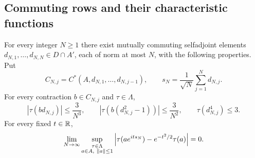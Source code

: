\subsection{Commuting rows and their characteristic functions}

\begin{proposition}
\label{u:prop:conditional-clt}
For every integer $N\geq1$ there exist mutually commuting selfadjoint
elements $d_{N,1},\ldots,d_{N,N}\in D\cap A'$, each of norm at most
$N$, with the following properties.  Put
\[
  C_{N,j}=C^*(A,d_{N,1},\ldots,d_{N,j-1}),
  \qquad
  s_N=\frac{1}{\sqrt N}\sum_{j=1}^N d_{N,j}.
\]
For every contraction $b\in C_{N,j}$ and $\tau\in\Lambda$,
\begin{equation}
\label{u:eq:row-moments}
  |\tau(bd_{N,j})|\leq\frac{3}{N^3},\qquad
  |\tau(b(d_{N,j}^2-1))|\leq\frac{3}{N^2},\qquad
  \tau(d_{N,j}^4)\leq3.
\end{equation}
For every fixed $t\in\mathbb R$,
\begin{equation}
\label{u:eq:uniform-characteristic-functions}
  \lim_{N\to\infty}
  \sup_{\substack{\tau\in\Lambda\\a\in A,\ \lVert a\rVert\leq1}}
  \left|\tau(ae^{its_N})-e^{-t^2/2}\tau(a)\right|=0.
\end{equation}
\end{proposition}

